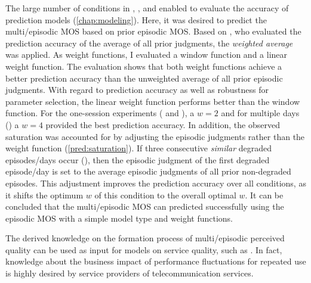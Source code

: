 The large number of conditions in , \EIIa{}, and  enabled to evaluate the accuracy of prediction models (\autoref{chap:modeling}).
Here, it was desired to predict the multi\-/episodic \ac{MOS} based on prior episodic \ac{MOS}.
Based on \citet{moller_single-call_2011}, who evaluated the prediction accuracy of the average of all prior judgments, the \emph{weighted average} was applied.
As weight functions, I evaluated a window function and a linear weight function.
The evaluation shows that both weight functions achieve a better prediction accuracy than the unweighted average of all prior episodic judgments.
With regard to prediction accuracy as well as robustness for parameter selection, the linear weight function performs better than the window function.
For the one-session experiments ( and \EIIa{}), a $\mathit{w}=2$ and for multiple days () a $\mathit{w}=4$ provided the best prediction accuracy.
In addition, the observed saturation was accounted for by adjusting the episodic judgments rather than the weight function (\autoref{pred:saturation}).
If three consecutive \emph{similar} degraded episodes/days occur (), then the episodic judgment of the first degraded episode/day is set to the average episodic judgments of all prior non-degraded episodes.
This adjustment improves the prediction accuracy over all conditions, as it shifts the optimum $\mathit{w}$ of this condition to the overall optimal $\mathit{w}$.
It can be concluded that the multi\-/episodic \ac{MOS} can predicted successfully using the episodic \ac{MOS} with a simple model type and weight functions.

The derived knowledge on the formation process of multi\-/episodic perceived quality can be used as input for models on service quality, such as \citet{parasuraman_conceptual_1985}.
In fact, knowledge about the business impact of performance fluctuations for repeated use is highly desired by service providers of telecommunication services.

